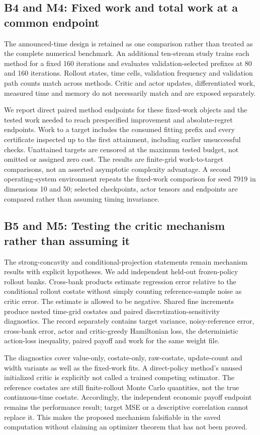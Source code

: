 \subsection*{B4 and M4: Fixed work and total work at a common endpoint}
The announced-time design is retained as one comparison rather than treated as the complete numerical benchmark. An additional ten-stream study trains each method for a fixed 160 iterations and evaluates validation-selected prefixes at 80 and 160 iterations. Rollout states, time cells, validation frequency and validation path counts match across methods. Critic and actor updates, differentiated work, measured time and memory do not necessarily match and are exposed separately.

We report direct paired method endpoints for these fixed-work objects and the tested work needed to reach prespecified improvement and absolute-regret endpoints. Work to a target includes the consumed fitting prefix and every certificate inspected up to the first attainment, including earlier unsuccessful checks. Unattained targets are censored at the maximum tested budget, not omitted or assigned zero cost. The results are finite-grid work-to-target comparisons, not an asserted asymptotic complexity advantage. A second operating-system environment repeats the fixed-work comparison for seed 7919 in dimensions 10 and 50; selected checkpoints, actor tensors and endpoints are compared rather than assuming timing invariance.

\subsection*{B5 and M5: Testing the critic mechanism rather than assuming it}
The strong-concavity and conditional-projection statements remain mechanism results with explicit hypotheses. We add independent held-out frozen-policy rollout banks. Cross-bank products estimate regression error relative to the conditional rollout costate without simply counting reference-sample noise as critic error. The estimate is allowed to be negative. Shared fine increments produce nested time-grid costates and paired discretization-sensitivity diagnostics. The record separately contains target variance, noisy-reference error, cross-bank error, actor and critic-greedy Hamiltonian loss, the deterministic action-loss inequality, paired payoff and work for the same weight file.

The diagnostics cover value-only, costate-only, raw-costate, update-count and width variants as well as the fixed-work fits. A direct-policy method's unused initialized critic is explicitly not called a trained competing estimator. The reference costates are still finite-rollout Monte Carlo quantities, not the true continuous-time costate. Accordingly, the independent economic payoff endpoint remains the performance result; target MSE or a descriptive correlation cannot replace it. This makes the proposed mechanism falsifiable in the saved computation without claiming an optimizer theorem that has not been proved.

